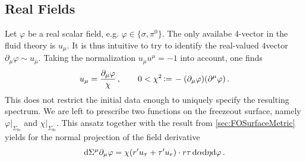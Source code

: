 \subsection{Real Fields}
\label{sec:FluidFromRealScalar}

Let $\varphi$ be a real scalar field, e.g. ${\varphi\in\{\sigma,\pi^0\}}$. The only availabe $4$-vector in the fluid theory is $u_\mu$. It is thus intuitive to try to identify the real-valued $4$vector ${\partial_\mu\varphi\sim u_\mu}$. Taking the normalization ${u_\mu u^\mu=-1}$ into account, one finds
\begin{equation}
    u_\mu=\frac{\partial_\mu\varphi}{\chi}\,,\qquad0<\chi^2{\,\vcentcolon=\,}-(\partial_\mu\varphi)(\partial^\mu\varphi)\,.
\end{equation}
This does not restrict the initial data enough to uniquely specify the resulting spectrum. We are left to prescribe two functions on the freezeout surface, namely $\varphi\vert_{\Sigma_{\text{fo}}}$ and $\chi\vert_{\Sigma_{\text{fo}}}$. This ansatz together with the result from \ref{sec:FOSurfaceMetric} yields for the normal projection of the field derivative
\begin{equation}
    \text{d}\Sigma^\mu\partial_\mu\varphi=\chi(r^\prime u_\tau+\tau^\prime u_r)\cdot r\tau\,\text{d}\alpha\text{d}\eta\text{d}\varphi\,.
\end{equation}

